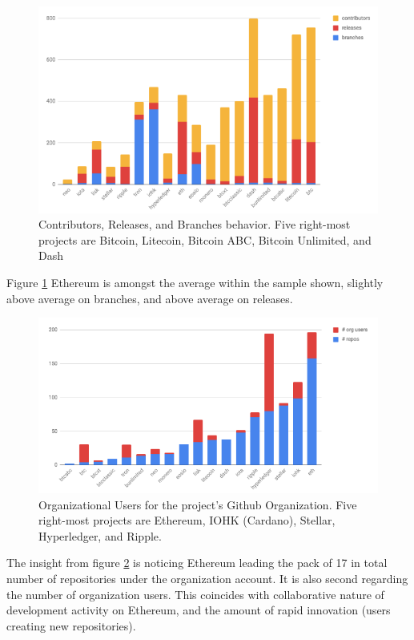 \documentclass[12pt, titlepage, twocolumn]{report}
\begin{document}
\begin{figure}[ht]
\centering
	\includegraphics[width=\textwidth]{contrib_releases_branches}
	\caption{Contributors, Releases, and Branches behavior. Five right-most projects are Bitcoin, Litecoin, Bitcoin ABC, Bitcoin Unlimited, and Dash}
	\label{contrib_releases_branches}
\end{figure}

Figure \ref{contrib_releases_branches} Ethereum is amongst the average within the sample shown, slightly above average on branches, and above average on releases.


\begin{figure}[ht]
\centering
	\includegraphics[width=\textwidth]{org_users_repos}
	\caption{Organizational Users for the project's Github Organization. Five right-most projects are Ethereum, IOHK (Cardano), Stellar, Hyperledger, and Ripple.}
	\label{org_users_repos}
\end{figure}

The insight from figure \ref{org_users_repos} is noticing Ethereum leading the pack of 17 in total number of repositories under the organization account. It is also second regarding the number of organization users. This coincides with collaborative nature of development activity on Ethereum, and the amount of rapid innovation (users creating new repositories). 
\end{document}
